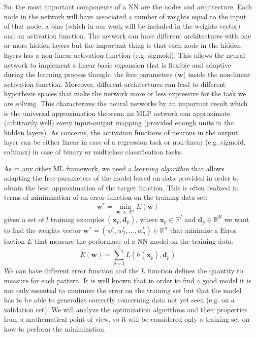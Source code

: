 So, the most important components of a NN are the nodes and architecture. Each node in the network will have associated a number of weights equal to the input of that node, a bias (which in our work will be included in the weights vector) and an activation function. The network can have different architectures with one or more hidden layers but the important thing is that each node in the hidden layers has a non-linear activation function (e.g. sigmoid). This allows the neural network to implement a linear basic expansion that is flexible and adaptive during the learning process thought the free parameters ($\mathbf{w}$) inside the non-linear activation function. Moreover, different architectures can lead to different hypothesis spaces that make the network more or less expressive for the task we are solving. This characterizes the neural networks by an important result which is the universal approximation theorem: an MLP network can approximate (arbitrarily well) every input-output mapping (provided enough units in the hidden layers). As concerns, the activation functions of neurons in the output layer can be either linear in case of a regression task or non-linear (e.g. sigmoid, softmax) in case of binary or multiclass classification tasks.

As in any other ML framework, we need a \emph{learning algorithm} that allows adapting the free-parameters of the model based on data provided in order to obtain the best approximation of the target function. This is often realized in terms of minimization of an error function on the training data set:
\begin{equation}
    \mathbf{w}^* = \min_{\mathbf{w} \;	\in \; \mathbb{R}^n} E(\mathbf{w})
\end{equation}
given a set of $l$ training examples $(\mathbf{x}_p,\mathbf{d}_p)$, where $\mathbf{x}_p \in \mathbb{R}^I$ and $\mathbf{d}_p \in \mathbb{R}^R$ we want to find the weights vector $\mathbf{w}^* = (w_1^*,w_2^*, ..., w_n^*) \in \mathbb{R}^n$  that minimize a Error fuction $E$ that measure the performace of a NN model on the training data.
\begin{equation}
E(\mathbf{w})  = \sum_{p=1}^{l}L(h(\mathbf{x}_p), \mathbf{d}_p)
\end{equation}
We can have different error function and the $L$ function defines the quantity to measure for each pattern. It is well known that in order to find a good model it is not only essential to minimize the error on the training set but that the model has to be able to generalize correctly concerning data not yet seen (e.g. on a validation set). We will analyze the optimization algorithms and their properties from a mathematical point of view, so it will be considered only a training set on how to perform the minimization. 

